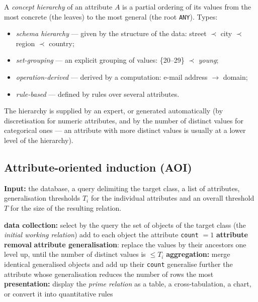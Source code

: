 \documentclass[11pt,a4paper]{article}
\theoremstyle{definition}
\begin{document}
\begin{defbox}
A \emph{concept hierarchy} of an attribute $A$ is a partial ordering of its values from the most
concrete (the leaves) to the most general (the root \texttt{ANY}). Types:
\begin{itemize}
\item \emph{schema hierarchy} --- given by the structure of the data: street $\prec$ city $\prec$
      region $\prec$ country;
\item \emph{set-grouping} --- an explicit grouping of values: \{20--29\} $\prec$ \emph{young};
\item \emph{operation-derived} --- derived by a computation: e-mail address $\to$ domain;
\item \emph{rule-based} --- defined by rules over several attributes.
\end{itemize}
The hierarchy is supplied by an expert, or generated automatically (by discretisation for numeric
attributes, and by the number of distinct values for categorical ones --- an attribute with more
distinct values is usually at a lower level of the hierarchy).
\end{defbox}

\subsection{Attribute-oriented induction (AOI)}

\begin{defbox}
\textbf{Input:} the database, a query delimiting the target class, a list of attributes,
generalisation thresholds $T_i$ for the individual attributes and an overall threshold $T$ for the
size of the resulting relation.

\begin{algorithmic}[1]
\State \textbf{data collection:} select by the query the set of objects of the target class (the
       \emph{initial working relation})
\State add to each object the attribute \texttt{count} $=1$
      \State \textbf{attribute removal}
      \State \textbf{attribute generalisation}: replace the values by their ancestors one level up,
      \State until the number of distinct values is $\le T_i$
   \EndIf
\EndFor
\State \textbf{aggregation:} merge identical generalised objects and add up their \texttt{count}
   \State generalise further the attribute whose generalisation reduces the number of rows the most
\EndWhile
\State \textbf{presentation:} display the \emph{prime relation} as a table, a cross-tabulation, a
       chart,
\State or convert it into quantitative rules
\end{algorithmic}
\end{defbox}
\end{document}
